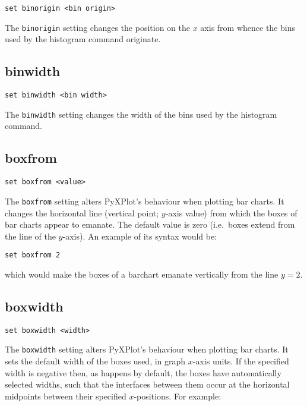 \begin{verbatim}
set binorigin <bin origin>
\end{verbatim}

The {\tt binorigin} setting changes the position on the $x$ axis from whence
the bins used by the histogram command originate.

\subsection{binwidth}

\begin{verbatim}
set binwidth <bin width>
\end{verbatim}

The {\tt binwidth} setting changes the width of the bins used by the histogram
command.

\subsection{boxfrom}

\begin{verbatim}
set boxfrom <value>
\end{verbatim}

The {\tt boxfrom} setting alters PyXPlot's behaviour when plotting bar charts.
It changes the horizontal line (vertical point; $y$-axis value) from which the
boxes of bar charts appear to emanate.  The default value is zero (i.e.\ boxes
extend from the line of the $y$-axis). An example of its syntax would be:

\begin{verbatim}
set boxfrom 2
\end{verbatim}

\noindent which would make the boxes of a barchart emanate vertically from the line $y=2$.


\subsection{boxwidth}

\begin{verbatim}
set boxwidth <width>
\end{verbatim}

The {\tt boxwidth} setting alters PyXPlot's behaviour when plotting bar charts.
It sets the default width of the boxes used, in graph $x$-axis units.  If the
specified width is negative then, as happens by default, the boxes have
automatically selected widths, such that the interfaces between them occur at
the horizontal midpoints between their specified $x$-positions.  For example:

